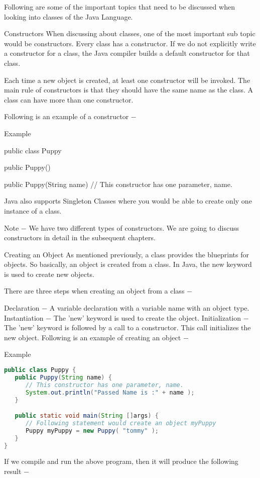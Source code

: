 Following are some of the important topics that need to be discussed when looking into classes of the Java Language.

Constructors
When discussing about classes, one of the most important sub topic would be constructors. Every class has a constructor. If we do not explicitly write a constructor for a class, the Java compiler builds a default constructor for that class.

Each time a new object is created, at least one constructor will be invoked. The main rule of constructors is that they should have the same name as the class. A class can have more than one constructor.

Following is an example of a constructor −

Example

public class Puppy {
   public Puppy() {
   }

   public Puppy(String name) {
      // This constructor has one parameter, name.
   }
}
Java also supports Singleton Classes where you would be able to create only one instance of a class.

Note − We have two different types of constructors. We are going to discuss constructors in detail in the subsequent chapters.

Creating an Object
As mentioned previously, a class provides the blueprints for objects. So basically, an object is created from a class. In Java, the new keyword is used to create new objects.

There are three steps when creating an object from a class −

Declaration − A variable declaration with a variable name with an object type.
Instantiation − The 'new' keyword is used to create the object.
Initialization − The 'new' keyword is followed by a call to a constructor. This call initializes the new object.
Following is an example of creating an object −

Example

\begin{lstlisting}[language=Java]
public class Puppy {
   public Puppy(String name) {
      // This constructor has one parameter, name.
      System.out.println("Passed Name is :" + name );
   }

   public static void main(String []args) {
      // Following statement would create an object myPuppy
      Puppy myPuppy = new Puppy( "tommy" );
   }
}
\end{lstlisting}

If we compile and run the above program, then it will produce the following result −

